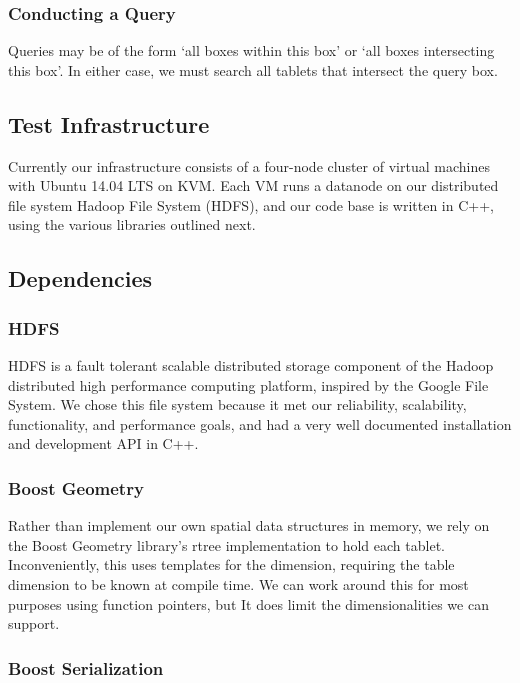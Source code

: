 \documentclass[11pt]{article}
\begin{document}
\subsubsection{Conducting a Query}

Queries may be of the form `all boxes within this box' or `all boxes intersecting this box'. In either case, we must search all tablets that intersect the query box. 

\subsection{Test Infrastructure}

Currently our infrastructure consists of a four-node cluster of virtual machines with Ubuntu 14.04 LTS on KVM. Each VM runs a datanode on our distributed file system Hadoop File System (HDFS), and our code base is written in C++, using the various libraries outlined next.

\subsection{Dependencies}

\subsubsection{HDFS}

HDFS is a fault tolerant scalable distributed storage component of the Hadoop distributed high performance computing platform, inspired by the Google File System. We chose this file system because it met our reliability, scalability, functionality, and performance goals, and had a very well documented installation and development API in C++. 

\subsubsection{Boost Geometry}

Rather than implement our own spatial data structures in memory, we rely on the Boost Geometry library's rtree implementation to hold each tablet. Inconveniently, this uses templates for the dimension, requiring the table dimension to be known at compile time. We can work around this for most purposes using function pointers, but It does limit the dimensionalities we can support.

\subsubsection{Boost Serialization}
\end{document}
